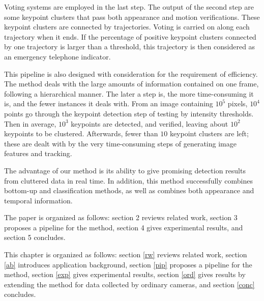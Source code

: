 Voting systems are employed in the last step. The output of the second step are some keypoint clusters that pass both appearance and motion verifications. These keypoint clusters are connected by trajectories. Voting is carried on along each trajectory when it ends. If the percentage of positive keypoint clusters connected by one trajectory is larger than a threshold, this trajectory is then considered as an emergency telephone indicator.



This pipeline is also designed  with consideration for the requirement of efficiency.  The method deals with the large amounts of information contained on one frame, following a hierarchical manner. The later a step is, the more time-consuming it is, and the fewer instances it deals with. From an image containing $10^5$ pixels, $10^4$ points go through the keypoint detection step of testing by intensity thresholds. Then in average, $10^3$ keypoints are detected, and verified, leaving about $10^2$ keypoints to be clustered. Afterwards, fewer than $10$ keypoint clusters are left; these are dealt with by the very time-consuming steps of generating image features and tracking.

The advantage of our method is its ability to give promising detection results from cluttered data in real time. In addition, this method successfully  combines bottom-up and classification methods, as well as combines both appearance and temporal information.




The paper is organized as follows: section 2 reviews related work, section 3 proposes a pipeline for the method, section 4 gives experimental results, and section 5 concludes.

This chapter is organized as follows: section \ref{rw} reviews related work, section \ref{ab} introduces application background, section \ref{pip} proposes a pipeline for the method, section \ref{exp} gives experimental results, section \ref{ord} gives results by extending the method for data collected by ordinary cameras, and section \ref{conc} concludes.














